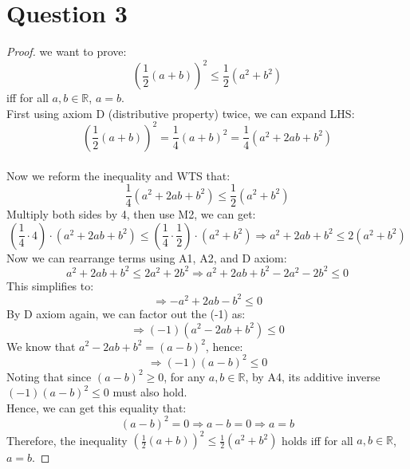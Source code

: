 \documentclass{article}
\begin{document}
\section*{Question 3}
\begin{proof}
    we want to prove:
    \[ \left( \frac{1}{2} (a + b) \right)^2 \leq \frac{1}{2} (a^2 + b^2) \]
    iff for all $a,b \in \mathbb{R}$, $a = b$.
    \\
    First using axiom D (distributive property) twice, we can expand LHS:
    \[ \left( \frac{1}{2} (a + b) \right)^2 = \frac{1}{4}(a + b)^2 = \frac{1}{4}(a^2 + 2ab + b^2) \]
    \\
    Now we reform the inequality and WTS that:
    \[ \frac{1}{4}(a^2 + 2ab + b^2) \leq \frac{1}{2} (a^2 + b^2) \]
    Multiply both sides by 4, then use M2, we can get:
    \[ (\frac{1}{4} \cdot 4) \cdot (a^2 + 2ab + b^2) \leq (\frac{1}{4} \cdot \frac{1}{2}) \cdot (a^2 + b^2) \Rightarrow a^2 + 2ab + b^2 \leq 2(a^2 + b^2) \]
    Now we can rearrange terms using A1, A2, and D axiom:
    \[ a^2 + 2ab + b^2 \leq 2a^2 + 2b^2 \Rightarrow a^2 + 2ab + b^2 - 2a^2 - 2b^2 \leq 0 \]
    This simplifies to:
    \[ \Rightarrow -a^2 + 2ab - b^2 \leq 0 \]
    By D axiom again, we can factor out the (-1) as:
    \[ \Rightarrow (-1)(a^2 - 2ab + b^2) \leq 0 \]
    We know that \( a^2 - 2ab + b^2 = (a - b)^2 \), hence:
    \[ \Rightarrow (-1)(a - b)^2 \leq 0 \]
    Noting that since $(a - b)^2 \geq 0$, for any $a,b \in \mathbb{R}$, by A4, its additive inverse $(-1)(a - b)^2 \leq 0$ must also hold.
    \\
    Hence, we can get this equality that:
    \[ (a - b)^2 = 0 \Rightarrow a - b = 0 \Rightarrow  a = b \]
    Therefore, the inequality $\left( \frac{1}{2} (a + b) \right)^2 \leq \frac{1}{2} (a^2 + b^2)$ holds iff for all $a,b \in \mathbb{R}$, $a = b$.
\end{proof}
\end{document}
